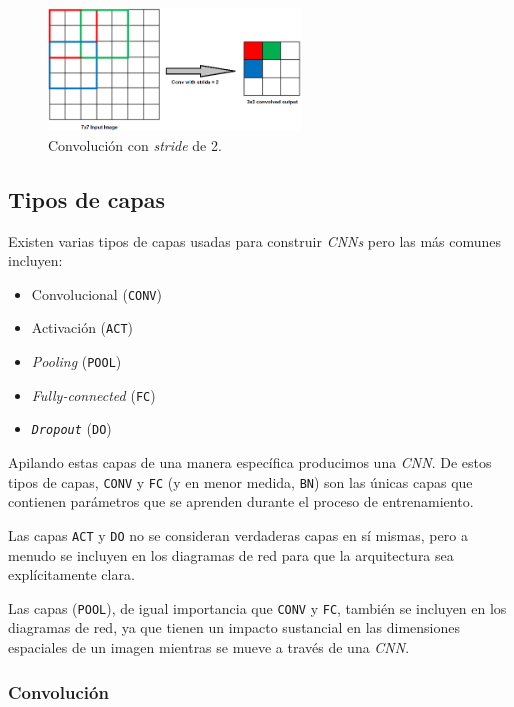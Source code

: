 \documentclass[a4paper,12pt]{article}
\begin{document}
\begin{figure}[H]
	\begin{center}				
	\includegraphics[width=0.6\textwidth]{tesis_44.png}
  	\caption{Convolución con \textit{stride} de 2.}
  	\label{fig:stride}
  	\end{center}
\end{figure}

\subsection{Tipos de capas}
Existen varias tipos de capas usadas \citep{rosebrock2017deep} para construir \textit{CNNs} pero las más comunes incluyen:

\begin{itemize}
	\item Convolucional (\texttt{CONV})
	\item Activación (\texttt{ACT})
	\item \textit{Pooling} (\texttt{POOL})
	\item \textit{Fully-connected} (\texttt{FC})
	\item \texttt{\textit{Dropout}} (\texttt{DO})
\end{itemize}

Apilando estas capas de una manera específica producimos una \textit{CNN}. De estos tipos de capas, \texttt{CONV} y \texttt{FC} (y en menor medida, \texttt{BN}) son las únicas capas que contienen parámetros que se aprenden durante el proceso de entrenamiento.

Las capas \texttt{ACT} y \texttt{DO} no se consideran verdaderas capas en sí mismas, pero a menudo se incluyen en los diagramas de red para que la arquitectura sea explícitamente clara.

Las capas (\texttt{POOL}), de igual importancia que \texttt{CONV} y \texttt{FC}, también se incluyen en los diagramas de red, ya que tienen un impacto sustancial en las dimensiones espaciales de un
imagen mientras se mueve a través de una \textit{CNN}.

\subsubsection{Convolución}
\end{document}
